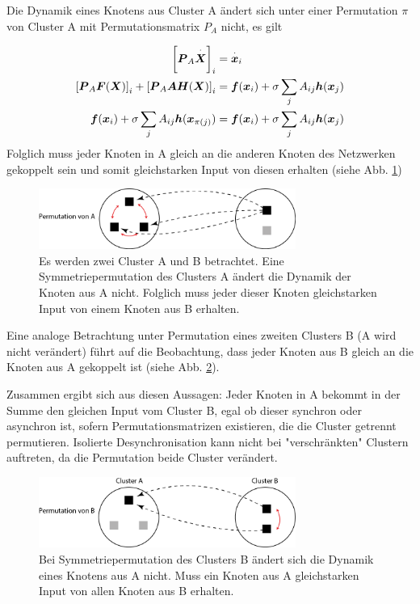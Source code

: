 Die Dynamik eines Knotens aus Cluster A ändert sich unter einer Permutation $\pi$ von Cluster A mit Permutationsmatrix $P_A$ nicht, es gilt



\begin{align}
		\notag \left[\boldsymbol{P}_A	\overset{\cdot}{\boldsymbol{X}}\right]_i&= \overset{\cdot}{\boldsymbol{x}}_i\\
		\notag\left[\boldsymbol{P}_A \boldsymbol{F}(\boldsymbol{X})\right]_i+
			\left[\boldsymbol{P}_A\boldsymbol{A}\boldsymbol{H}(\boldsymbol{X})\right]_i&=
			\boldsymbol{f}(\boldsymbol{x}_i)+
			\sigma\sum_j A_{ij}\boldsymbol{h}(\boldsymbol{x}_j)\\
		\boldsymbol{f}(\boldsymbol{x}_i)+
			\sigma\sum_j A_{ij}\boldsymbol{h}(\boldsymbol{x}_{\pi\left(j\right)})&=
		\boldsymbol{f}(\boldsymbol{x}_i)+
			\sigma\sum_j A_{ij}\boldsymbol{h}(\boldsymbol{x}_j)		
\end{align}
Folglich muss jeder Knoten in A gleich an die anderen Knoten des Netzwerken gekoppelt sein und somit gleichstarken Input von diesen erhalten (siehe Abb. \ref{fig:perma})

\begin{figure}
		\includegraphics[width=0.75\textwidth]{abb/misc/perm_a.png}
		\caption{Es werden zwei Cluster A und B betrachtet. Eine Symmetriepermutation des Clusters A ändert die Dynamik der Knoten aus A nicht. Folglich muss jeder dieser Knoten gleichstarken Input von einem Knoten aus B erhalten.}
		\label{fig:perma}
\end{figure}


Eine analoge Betrachtung  unter Permutation eines zweiten Clusters B (A wird nicht verändert) führt auf die Beobachtung, dass jeder Knoten aus B gleich an die Knoten aus A gekoppelt ist (siehe Abb. \ref{fig:permb}). 

Zusammen ergibt sich aus diesen Aussagen: Jeder Knoten in A bekommt in der Summe den gleichen Input vom Cluster B, egal ob dieser synchron oder asynchron ist, sofern Permutationsmatrizen existieren, die die Cluster getrennt permutieren. Isolierte Desynchronisation kann nicht bei "verschränkten" Clustern auftreten, da die Permutation beide Cluster verändert.

	\begin{figure}
		\includegraphics[width=0.75\textwidth]{abb/misc/perm_b.png}
		\caption{Bei Symmetriepermutation des Clusters B ändert sich die Dynamik eines Knotens aus A nicht. Muss ein Knoten aus A gleichstarken Input von allen Knoten aus B erhalten.}
		\label{fig:permb}
	\end{figure}
	

